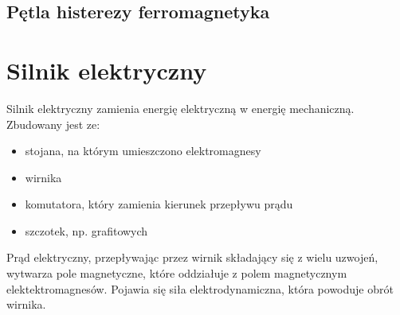     \subsection{Pętla histerezy ferromagnetyka}

  \section{Silnik elektryczny}
    Silnik elektryczny zamienia energię elektryczną w energię mechaniczną. Zbudowany jest ze:
    \begin{itemize}
      \item stojana, na którym umieszczono elektromagnesy
      \item wirnika
      \item komutatora, który zamienia kierunek przepływu prądu
      \item szczotek, np. grafitowych
    \end{itemize}

    Prąd elektryczny, przepływając przez wirnik składający się z wielu uzwojeń, wytwarza pole magnetyczne, które oddziałuje z polem magnetycznym elektektromagnesów. Pojawia się siła elektrodynamiczna, która powoduje obrót wirnika.
